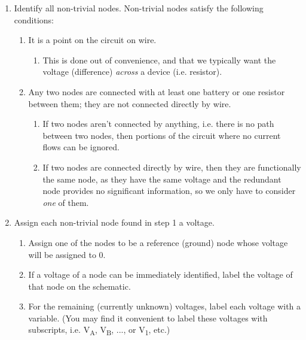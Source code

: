 \documentclass[12pt,letterpaper]{article}
\begin{document}
\begin{enumerate}

\item Identify all non-trivial nodes. Non-trivial nodes satisfy the following conditions:

	\begin{enumerate}

	\item It is a point on the circuit on wire. 
		\begin{enumerate}
		\item This is done out of convenience, and that we typically want the voltage (difference) \textit{across} a device (i.e. resistor).
		\end{enumerate}
	\item Any two nodes are connected with at least one battery or one resistor between them; they are not connected directly by wire.
		\begin{enumerate}
		\item If two nodes aren't connected by anything, i.e. there is no path between two nodes, then portions of the circuit where no current flows can be ignored.
		\item If two nodes are connected directly by wire, then they are functionally the same node, as they have the same voltage and the redundant node provides no significant information, so we only have to consider \textit{one} of them.
		\end{enumerate}
	\end{enumerate}

\item Assign each non-trivial node found in step 1 a voltage.
		\begin{enumerate}
		\item Assign one of the nodes to be a reference (ground) node whose voltage will be assigned to 0. 
		\item If a voltage of a node can be immediately identified, label the voltage of that node on the schematic.
		\item For the remaining (currently unknown) voltages, label each voltage with a variable. (You may find it convenient to label these voltages with subscripts, i.e. V\textsubscript{A}, V\textsubscript{B}, ..., or V\textsubscript{1}, etc.)
		\end{enumerate}



\end{enumerate}
\end{document}
